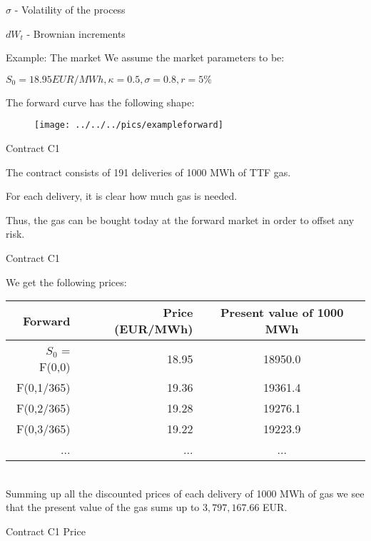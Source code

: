 	$\sigma$ - Volatility of the process


	$dW_t$ - Brownian increments





{Example: The market}
We assume the market parameters to be:






	$S_0 = 18.95 EUR/MWh, \kappa = 0.5, \sigma = 0.8, r= 5\%$




The forward curve has the following shape:
\begin{figure}
	\centering
		\texttt{[image: ../../../pics/exampleforward]}
	\label{fig:exampleforward}
\end{figure}

{Contract C1}






	The contract consists of 191 deliveries of 1000 MWh of TTF gas.


	For each delivery, it is clear how much gas is needed.


	Thus, the gas can be bought today at the forward market in order to offset any risk.





{Contract C1}

We get the following prices:
\begin{tabular}{rrc}
   Forward &      Price (EUR/MWh)& Present value of 1000 MWh \\
\hline
$S_0$ = F(0,0) &         18.95 &      18950.0 \\

 F(0,1/365) &    19.36 &    19361.4 \\

 F(0,2/365) &    19.28 &    19276.1 \\

 F(0,3/365) &    19.22 &    19223.9 \\
...&...&...\\
\end{tabular}  \\
Summing up all the discounted prices of each delivery of 1000 MWh of gas we see that the present value of the gas sums up to $3,797,167.66$ EUR.

{Contract C1 Price}


